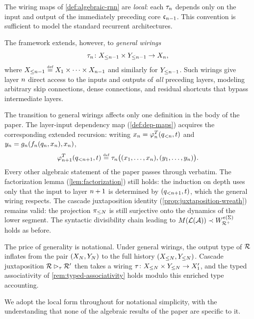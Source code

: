 \documentclass{article}
\begin{document}
\begin{remark}\label{rem:general-wirings}
The wiring maps of \cref{def:algebraic-rnn} are \emph{local}: each $\tau_n$ depends only on the input and output of the immediately preceding core $\mathfrak{c}_{n-1}$. This convention is sufficient to model the standard recurrent architectures. 

The framework extends, however, to \emph{general wirings}
$$ 
\tau_n \colon X_{\leq n-1} \times Y_{\leq n-1} \to X_n, 
$$
where $X_{\leq n-1} \mathrel{\stackrel{\textnormal{\tiny def}}{=}} X_1 \times \cdots \times X_{n-1}$ and similarly for $Y_{\leq n-1}$. 
Such wirings give layer $n$ direct access to the inputs and outputs of \emph{all} preceding layers, modeling arbitrary skip connections, dense connections, and residual shortcuts that bypass intermediate layers.

The transition to general wirings affects only one definition in the body of the paper. 
The layer-input dependency map (\cref{def:dep-maps}) acquires the corresponding extended recursion: writing 
$x_n = \varphi_n^T(q_{<n}, t)$ and $y_n = g_n(f_n(q_n, x_n), x_n)$,
$$ \varphi_{n+1}^T(q_{<n+1}, t) \mathrel{\stackrel{\textnormal{\tiny def}}{=}} \tau_n\bigl( (x_1, \ldots, x_n), (y_1, \ldots, y_n) \bigr). $$
Every other algebraic statement of the paper passes through verbatim. 
The factorization lemma (\cref{lem:factorization}) still holds: the induction on depth uses only that the input to layer $n+1$ is determined by $(q_{<n+1}, t)$, which the general wiring respects. The cascade juxtaposition identity (\cref{prop:juxtaposition-wreath}) remains valid: the projection $\pi_{\leq N}$ is still surjective onto the dynamics of the lower segment. 
The syntactic divisibility chain leading to $M(\mathcal{L}(\mathcal{A})) \prec W_{{\mathcal{R}^{+}}}^{e(\Sigma)}$ holds as before.

The price of generality is notational. Under general wirings, the output type of $\mathcal{R}$ inflates from the pair $(X_N, Y_N)$ to the full history $(X_{\leq N}, Y_{\leq N})$. 
Cascade juxtaposition $\mathcal{R} \mathbin{\rhd_{\tau}} \mathcal{R}'$ then takes a wiring $\tau \colon X_{\leq N} \times Y_{\leq N} \to X_1'$, and the typed associativity of \cref{rem:typed-associativity} holds modulo this enriched type accounting.

We adopt the local form throughout for notational simplicity, with the understanding that none of the algebraic results of the paper are specific to it.
\end{remark}
\end{document}
